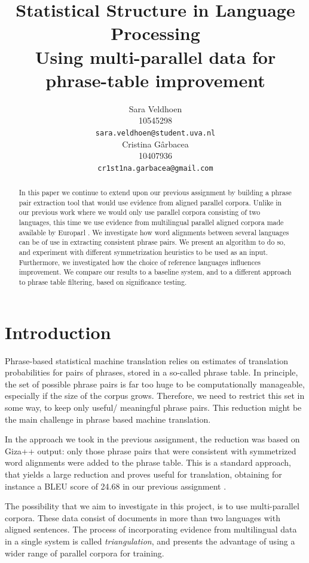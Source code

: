 \documentclass[11pt]{article}
\title{Statistical Structure in Language Processing \\Using multi-parallel data for phrase-table improvement}
\author{ Sara Veldhoen \\
  10545298 \\
  {\small \tt sara.veldhoen@student.uva.nl} 
  \\\And
  Cristina G\^arbacea\\
  10407936 \\
  {\small \tt cr1st1na.garbacea@gmail.com} \\}
\date{}
\begin{document}
\maketitle

\begin{abstract}
In this paper we continue to extend upon our previous assignment by building a phrase pair extraction tool that would use evidence from aligned parallel corpora. Unlike in our previous work where we would only use parallel corpora consisting of two languages, this time we use evidence from multilingual parallel aligned corpora made available by Europarl \cite{EuroparlUrl}. We investigate how word alignments between several languages can be of use in extracting consistent phrase pairs. %
We present an algorithm to do so, and experiment with different symmetrization heuristics to be used as an input. Furthermore, we investigated how the choice of reference languages influences improvement. We compare our results to a baseline system, and to a different approach to phrase table filtering, based on significance testing.
\end{abstract}

\section{Introduction}
Phrase-based statistical machine translation relies on estimates of translation probabilities for pairs of phrases, stored in a so-called phrase table.
In principle, the set of possible phrase pairs is far too huge to be computationally manageable, especially if the size of the corpus grows.
Therefore, we need to restrict this set in some way, to keep only useful/ meaningful phrase pairs. This reduction might be the main challenge in phrase based machine translation.

In the approach we took in the previous assignment, the reduction was based on Giza++ output: only those phrase pairs that were consistent with symmetrized word alignments were added to the phrase table. This is a standard approach, that yields a large reduction and proves useful for translation, obtaining for instance a BLEU score of 24.68 in our previous assignment \cite{previous}.

The possibility that we aim to investigate in this project, is to use multi-parallel corpora. These data consist of documents in more than two languages with aligned sentences. The process of incorporating evidence from multilingual data in a single system is called \emph{triangulation}, and presents the advantage of using a wider range of parallel corpora for training. 
\end{document}
